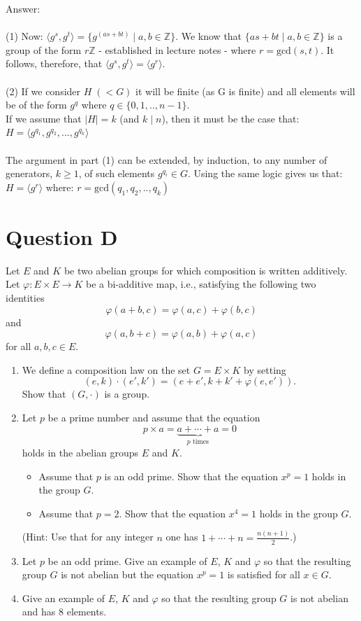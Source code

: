 \documentclass[12pt,a4paper]{article}
\begin{document}
\vspace{1cm}
\noindent
Answer:\\
\\
(1) Now: $\langle g^s, g^t \rangle = \{ g^{(as + bt)} \mid a,b \in \mathbb{Z} \}$.  We know that $\{as + bt \mid a,b \in \mathbb{Z}\}$ is a group of the form $r\mathbb{Z}$ - established in lecture notes - where
$r = \text{gcd}(s,t)$.  It follows, therefore, that $\langle g^s, g^t \rangle = \langle g^r \rangle$. \\
\\
(2) If we consider $H \; (< G)$ it will be finite (as G is finite) and all elements will be of the form $g^q$ where $q \in \{0,1,..,n-1\}$.\\
If we assume that $|H|=k$ (and $k \mid n$), then it must be the case that: $H = \langle g^{q_1}, g^{q_2}, ..., g^{q_k} \rangle$\\
\\
The argument in part (1) can be extended, by induction, to any number of generators, $k \ge 1$, of such elements $g^{q_i} \in G$.  Using the same logic gives us that: $H = \langle g^r \rangle$ where: $r = \text{gcd}(q_1,q_2,..,q_k)$\\

\newpage
\section*{Question D}
Let $E$ and $K$ be two abelian groups for which composition is written additively.
Let $\varphi:E\times E\to K$ be a bi-additive map, i.e., satisfying the following two identities
\[
\varphi(a+b,c)=\varphi(a,c)+\varphi(b,c)
\]
and
\[
\varphi(a,b+c)=\varphi(a,b)+\varphi(a,c)
\]
for all $a,b,c\in E$.
\begin{enumerate}
\item We define a composition law on the set $G=E\times K$ by setting
\[
(e,k)\cdot(e',k')=(e+e',k+k'+\varphi(e,e')).
\]
Show that $(G,\cdot)$ is a group.
\item Let $p$ be a prime number and assume that the equation
\[
p\times a=\underbrace{a+\cdots+a}_{p\text{ times}}=0
\]
holds in the abelian groups $E$ and $K$.
\begin{itemize}
\item Assume that $p$ is an odd prime. Show that the equation $x^p=1$ holds in the group $G$.
\item Assume that $p=2$. Show that the equation $x^4=1$ holds in the group $G$.
\end{itemize}
(Hint: Use that for any integer $n$ one has
$1+\cdots+n=\frac{n(n+1)}{2}$.)
\item Let $p$ be an odd prime. Give an example of $E$, $K$ and $\varphi$ so that the resulting group $G$ is not abelian but the equation $x^p=1$ is satisfied for all $x\in G$.
\item Give an example of $E$, $K$ and $\varphi$ so that the resulting group $G$ is not abelian and has $8$ elements.
\end{enumerate}
\end{document}
